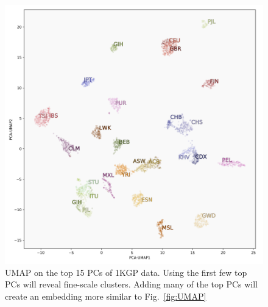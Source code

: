 \documentclass[12pt]{article}
\begin{document}
\begin{figure}
  \includegraphics[width=\linewidth]{code/images/1KGP_PCA_UMAP.png}
  \caption{UMAP on the top 15 PCs of 1KGP data. Using the first few top PCs will reveal fine-scale clusters. Adding many of the top PCs will create an embedding more similar to Fig.~\ref{fig:UMAP} }
  \label{fig:UMAP_fine_scale}
\end{figure}


\newpage
\end{document}
